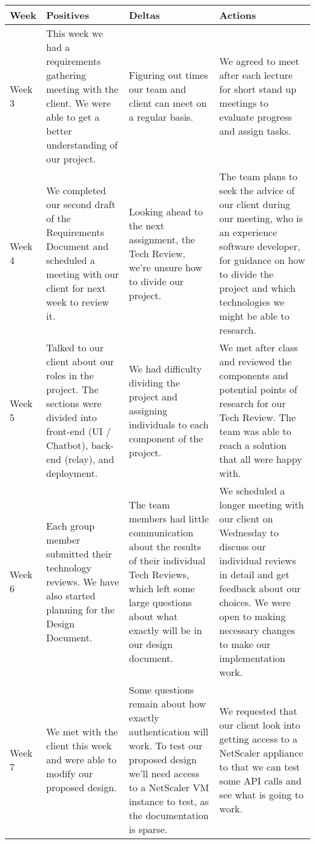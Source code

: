 \documentclass[onecolumn, draftclsnofoot,10pt, compsoc]{IEEEtran}
\begin{document}
\begin{tabular}{ p{} p{} p{} p{} }
    \textbf{Week} & \textbf{Positives} & \textbf{Deltas} & \textbf{Actions} \\ \hline
    Week 3 
        & %
        This week we had a requirements gathering meeting with the client.
        We were able to get a better understanding of our project.
        & %
        Figuring out times our team and client can meet on a regular basis.
        & %
        We agreed to meet after each lecture for short stand up meetings to evaluate progress and assign tasks.
        \\ \hline
    Week 4 
        & %
        We completed our second draft of the Requirements Document and scheduled a meeting with our client for next week to review it.
        & %
        Looking ahead to the next assignment, the Tech Review, we're unsure how to divide our project.
        & %
        The team plans to seek the advice of our client during our meeting, who is an experience software developer, for guidance on how to divide the project and which technologies we might be able to research.
        \\ \hline    
    Week 5 
        & %
        Talked to our client about our roles in the project.
        The sections were divided into front-end (UI / Chatbot), back-end (relay), and deployment.
        & %
        We had difficulty dividing the project and assigning individuals to each component of the project.
        & %
        We met after class and reviewed the components and potential points of research for our Tech Review.
        The team was able to reach a solution that all were happy with.
        \\ \hline
    Week 6
        & %
        Each group member submitted their technology reviews.
        We have also started planning for the Design Document.
        & %
        The team members had little communication about the results of their individual Tech Reviews, which left some large questions about what exactly will be in our design document.
        & %
        We scheduled a longer meeting with our client on Wednesday to discuss our individual reviews in detail and get feedback about our choices.
        We were open to making necessary changes to make our implementation work.
        \\ \hline
    Week 7
        & %
        We met with the client this week and were able to modify our proposed design.
        & %
        Some questions remain about how exactly authentication will work.
        To test our proposed design we'll need access to a NetScaler VM instance to test, as the documentation is sparse.
        & %
        We requested that our client look into getting access to a NetScaler appliance to that we can test some API calls and see what is going to work.
        \\ \hline
\end{tabular}
\end{document}

